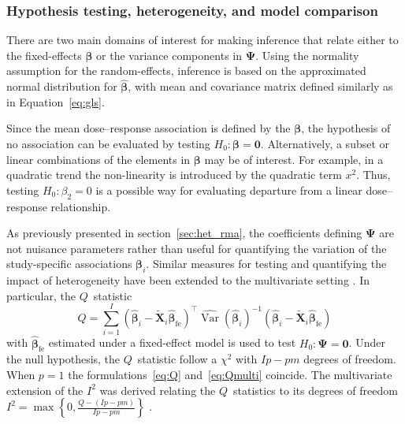 \documentclass[11pt,a4paper,twoside,openany]{book}\usepackage{knitr}
\DeclareMathOperator{\Var}{Var}
\begin{document}
{\subsubsection*{Hypothesis testing, heterogeneity, and model comparison}

There are two main domains of interest for making inference that relate either to the fixed-effects $\boldsymbol{\beta}$ or the variance components in $\boldsymbol{\Psi}$. Using the normality assumption for the random-effects, inference is based on the approximated normal distribution for $\boldsymbol{\hat \beta}$, with mean and covariance matrix defined similarly as in Equation~\ref{eq:gls}.

\noindent Since the mean dose--response association is defined by the $\boldsymbol \beta$, the hypothesis of no association can be evaluated by testing $H_0: \boldsymbol{\beta} = \boldsymbol{0}$. 
Alternatively, a subset or linear combinations of the elements in $\boldsymbol \beta$ may be of interest. For example, in a quadratic trend the non-linearity is introduced by the quadratic term $x^2$. Thus, testing $H_0: \beta_2 = 0$ is a possible way for evaluating departure from a linear dose--response relationship.

As previously presented in section~\ref{sec:het_rma}, the coefficients defining $\boldsymbol{\Psi}$ are not nuisance parameters rather than useful for quantifying the variation of the study-specific associations $\boldsymbol{\beta}_i$. Similar measures for testing and quantifying the impact of heterogeneity have been extended to the multivariate setting \citep{berkey1996multiple}. In particular, the $Q$~statistic
\begin{equation}
Q = \sum_{i=1}^I \left(\boldsymbol{\hat \beta}_i - \widetilde{\mathbf{X}}_i\boldsymbol{\hat \beta}_{\text{fe}}\right) ^\top \widehat{\Var} \left( \boldsymbol{\hat \beta}_i \right)^{-1} \left(\boldsymbol{\hat \beta}_i - \widetilde{\mathbf{X}}_i\boldsymbol{\hat \beta}_{\text{fe}}\right)
\label{eq:Qmulti}
\end{equation}
\noindent with $\boldsymbol{\hat \beta}_{\text{fe}}$ estimated under a fixed-effect model is used to test $H_0: \boldsymbol{\Psi} = \boldsymbol{0}$. Under the null hypothesis, the $Q$~statistic follow a $\chi^2$ with $Ip - pm$ degrees of freedom. When $p = 1$ the formulations~\ref{eq:Q} and~\ref{eq:Qmulti} coincide. The multivariate extension of the $I^2$ was derived relating the $Q$~statistics to its degrees of freedom $I^2 = \max \left\{0, \frac{Q- (Ip - pm)}{Ip - pm}\right\}$ \citep{jackson2012quantifying}.

}
\end{document}
